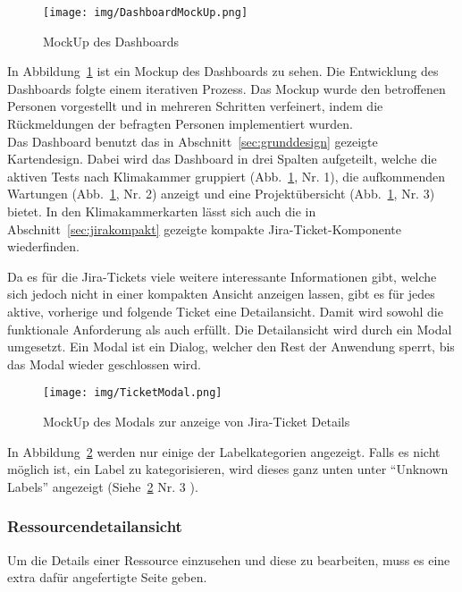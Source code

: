 \begin{figure}[H]
    \texttt{[image: img/DashboardMockUp.png]}
    \caption{MockUp des Dashboards}\label{fig:dashboard}
\end{figure}

In Abbildung~\ref{fig:dashboard} ist ein Mockup des Dashboards zu sehen. 
Die Entwicklung des Dashboards folgte einem iterativen Prozess. Das Mockup wurde
den betroffenen Personen vorgestellt und in mehreren Schritten verfeinert, indem die 
Rückmeldungen der befragten Personen implementiert wurden.\\

Das Dashboard benutzt das in Abschnitt~\ref{sec:grunddesign} gezeigte Kartendesign.
Dabei wird das Dashboard in drei Spalten aufgeteilt, welche die aktiven Tests nach
Klimakammer gruppiert (Abb.~\ref{fig:dashboard}, Nr. 1), 
die aufkommenden Wartungen (Abb.~\ref{fig:dashboard}, Nr. 2) anzeigt und eine 
Projektübersicht (Abb.~\ref{fig:dashboard}, Nr. 3) bietet. In den Klimakammerkarten
lässt sich auch die in Abschnitt~\ref{sec:jirakompakt} gezeigte kompakte 
Jira-Ticket-Komponente wiederfinden. 

Da es für die Jira-Tickets viele weitere interessante Informationen gibt, welche
sich jedoch nicht in einer kompakten Ansicht anzeigen lassen, gibt es für jedes
aktive, vorherige und folgende Ticket eine Detailansicht. Damit wird sowohl die
funktionale Anforderung  als auch  erfüllt.
Die Detailansicht wird durch ein Modal umgesetzt. Ein Modal ist ein Dialog, welcher den Rest der Anwendung sperrt,
bis das Modal wieder geschlossen wird.

\begin{figure}[H]
    \texttt{[image: img/TicketModal.png]}
    \caption{MockUp des Modals zur anzeige von Jira-Ticket Details}\label{fig:modal}
\end{figure}

In Abbildung~\ref{fig:modal} werden nur einige der Labelkategorien angezeigt.
Falls es nicht möglich ist, ein Label zu kategorisieren, wird dieses ganz unten 
unter ``Unknown Labels'' angezeigt (Siehe~\ref{fig:modal} Nr. 3 ). 

\subsubsection{Ressourcendetailansicht}
Um die Details einer Ressource einzusehen und diese zu bearbeiten, muss es eine 
extra dafür angefertigte Seite geben. \\


